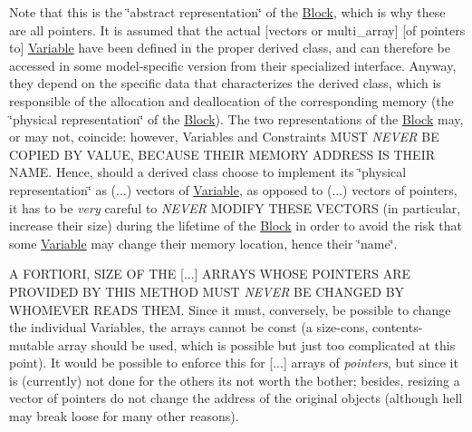 Note that this is the \char`\"{}abstract representation\char`\"{} of the \mbox{\hyperlink{class_s_m_spp__di__unipi__it_1_1_block}{Block}}, which is why these are all pointers. It is assumed that the actual \mbox{[}vectors or multi\+\_\+array\mbox{]} \mbox{[}of pointers to\mbox{]} \mbox{\hyperlink{class_s_m_spp__di__unipi__it_1_1_variable}{Variable}} have been defined in the proper derived class, and can therefore be accessed in some model-\/specific version from their specialized interface. Anyway, they depend on the specific data that characterizes the derived class, which is responsible of the allocation and deallocation of the corresponding memory (the \char`\"{}physical representation\char`\"{} of the \mbox{\hyperlink{class_s_m_spp__di__unipi__it_1_1_block}{Block}}). The two representations of the \mbox{\hyperlink{class_s_m_spp__di__unipi__it_1_1_block}{Block}} may, or may not, coincide\+: however, Variables and Constraints M\+U\+ST {\itshape N\+E\+V\+ER} BE C\+O\+P\+I\+ED BY V\+A\+L\+UE, B\+E\+C\+A\+U\+SE T\+H\+E\+IR M\+E\+M\+O\+RY A\+D\+D\+R\+E\+SS IS T\+H\+E\+IR N\+A\+ME. Hence, should a derived class choose to implement its \char`\"{}physical
   representation\char`\"{} as (...) vectors of \mbox{\hyperlink{class_s_m_spp__di__unipi__it_1_1_variable}{Variable}}, as opposed to (...) vectors of pointers, it has to be {\itshape very} careful to {\itshape N\+E\+V\+ER} M\+O\+D\+I\+FY T\+H\+E\+SE V\+E\+C\+T\+O\+RS (in particular, increase their size) during the lifetime of the \mbox{\hyperlink{class_s_m_spp__di__unipi__it_1_1_block}{Block}} in order to avoid the risk that some \mbox{\hyperlink{class_s_m_spp__di__unipi__it_1_1_variable}{Variable}} may change their memory location, hence their \char`\"{}name\char`\"{}.

A F\+O\+R\+T\+I\+O\+RI, S\+I\+ZE OF T\+HE \mbox{[}...\mbox{]} A\+R\+R\+A\+YS W\+H\+O\+SE P\+O\+I\+N\+T\+E\+RS A\+RE P\+R\+O\+V\+I\+D\+ED BY T\+H\+IS M\+E\+T\+H\+OD M\+U\+ST {\itshape N\+E\+V\+ER} BE C\+H\+A\+N\+G\+ED BY W\+H\+O\+M\+E\+V\+ER R\+E\+A\+DS T\+H\+EM. Since it must, conversely, be possible to change the individual Variables, the arrays cannot be const (a size-\/cons, contents-\/mutable array should be used, which is possible but just too complicated at this point). It would be possible to enforce this for \mbox{[}...\mbox{]} arrays of {\itshape pointers}, but since it is (currently) not done for the others it\textquotesingle{}s not worth the bother; besides, resizing a vector of pointers do not change the address of the original objects (although hell may break loose for many other reasons).

